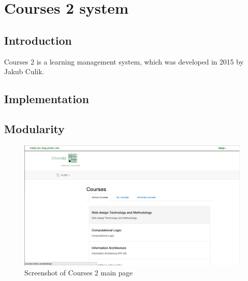 \chapter{Courses 2 system}

\label{kap:courses} %

\section{Introduction}
Courses 2 is a learning management system, which was developed in 2015 by Jakub Culik.

\section{Implementation}

\section{Modularity}

\begin{figure}[p]
    \centering
    \includegraphics[width=\textwidth]{courses/screenshot.png}
    \caption{Screenshot of Courses 2 main page}
    \label{fig:awesome_image}
\end{figure}
